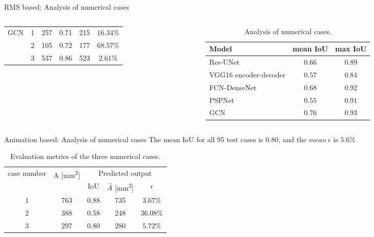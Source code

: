 \documentclass[10pt,aspectratio=169,dvipsnames]{beamer} %
\begin{document}
\begin{frame}{RMS based: Analysis of numerical cases}
\begin{columns}[T]
\begin{column}[t]{0.48\textwidth}
\begin{table}
\begin{tabular}{cccccc}
					\midrule
					\multirow{3}{*}{GCN} 
					& 1 & 257 & \multicolumn{1}{c}{0.71} & \multicolumn{1}{c}{215} & \(16.34\%\) \\ 
					& 2 & 105 & \multicolumn{1}{c}{0.72} & \multicolumn{1}{c}{177} & \(68.57\%\) \\ 
					& 3 & 537 & \multicolumn{1}{c}{0.86} & \multicolumn{1}{c}{523} & \(2.61\%\) \\ 
					\bottomrule[1.5pt]
				\end{tabular}	
			\end{table}
			\end{column}
			\begin{column}[t]{0.48\textwidth}
				\begin{table}
					\caption{Analysis of numerical cases.}
					\label{tab:table_all_numerical_cases_backup}	
					\begin{tabular}{lcc}
						\toprule[1.5pt]
						Model & mean IoU & max IoU \\ 
						\midrule 
						Res-UNet & \(0.66\) & \(0.89\) \\ 
						VGG16 encoder-decoder & \(0.57\) & \(0.84\) \\ 
						FCN-DenseNet & \(0.68\) & \(0.92\) \\ 
						PSPNet & \(0.55\) & \(0.91\) \\ 
						GCN & \(0.76\) & \(0.93\) \\ 
						\bottomrule[1.5pt]
					\end{tabular}
				\end{table}
			\end{column}
		\end{columns}
	\end{frame}
	\begin{frame}{Animation based: Analysis of numerical cases}
		The mean IoU for all 95 test cases is 0.80, and the \(mean\ \epsilon\) is \(5.6\%\)
		\begin{table}[!h]
			\centering
			\caption{Evaluation metrics of the three numerical cases.}
			\begin{tabular}{ccccc}
				\toprule[1.5pt]
				\multirow{2}{*}{case number} & \multicolumn{1}{c}{\multirow{2}{*}{A [mm\textsuperscript{2}]}} & \multicolumn{3}{c}{Predicted output} \\ 
				\cmidrule(lr){3-5} & & \multicolumn{1}{c}{IoU} & \multicolumn{1}{c}{\(\hat{A}\) [mm\textsuperscript{2}]} & \(\epsilon\) \\
				\midrule
				1 & 763 & \multicolumn{1}{c}{0.88} & \multicolumn{1}{c}{735} & \(3.67\%\) \\ 
				2 & 388 & \multicolumn{1}{c}{0.58} & \multicolumn{1}{c}{248} & \(36.08\%\) \\ 
				3 & 297 & \multicolumn{1}{c}{0.80} & \multicolumn{1}{c}{280} & \(5.72\%\) \\			 					
				\bottomrule[1.5pt]
			\end{tabular}	
			\label{tab:num_cases_}
		\end{table}			
	\end{frame}
\end{document}
